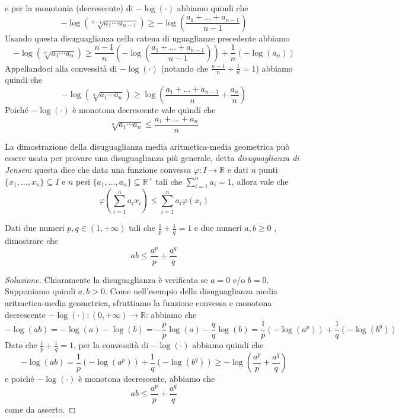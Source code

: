 \begin{example}
\[    \]
    e per la monotonia (decrescente) di $-\log(\cdot)$ abbiamo quindi che
    \[
    -\log(\sqrt[n-1]{a_1 \cdots a_{n-1}}) \ge -\log\left(\frac{a_1 + \dots + a_{n-1}}{n-1}\right)
    \]
    Usando questa disuguaglianza nella catena di uguaglianze precedente abbiamo
    \[
    -\log(\sqrt[n]{a_1 \cdots a_n}) \ge \frac{n-1}{n}\left(-\log\left(\frac{a_1 + \dots + a_{n-1}}{n-1}\right)\right) +\frac{1}{n}(-\log(a_n))
    \]
    Appellandoci alla convessità di $-\log(\cdot)$ (notando che $\frac{n-1}{n}+\frac{1}{n}=1$) abbiamo quindi che
    \[
    -\log(\sqrt[n]{a_1 \cdots a_n}) \ge \log\left(\frac{a_1 + \dots + a_{n-1}}{n}+ \frac{a_n}{n}\right)
    \]
    Poiché $-\log(\cdot)$ è monotona decrescente vale quindi che
    \[
    \sqrt[n]{a_1 \cdots a_n} \le \frac{a_1+\dots + a_n}{n}
    \]
    \end{example}
    \begin{remark}
        La dimostrazione della disuguaglianza media aritmetica-media geometrica può essere usata per provare una disuguaglianza più generale, detta \emph{disuguaglianza di Jensen}: questa dice che data una funzione convessa $\varphi \colon I \to \mathbb{R}$ e dati $n$ punti $\{x_1, \dots, x_n\}\subseteq I$ e $n$ pesi $\{a_1, \dots, a_n\}\subseteq \mathbb{R}^+$ tali che $\sum_{i=1}^n a_i = 1$, allora vale che
        \[
        \varphi\left(\sum_{i=1}^n a_i x_i\right)\le \sum_{i=1}^n a_i \varphi(x_i)
        \]
    \end{remark}
    \begin{exercise}
        \label{ex:9n.2}
        Dati due numeri $p,q\in(1,+\infty)$ tali che $\frac{1}{p}+\frac{1}{q}=1$ e due numeri $a,b\ge 0$ , dimostrare che
        \[
        ab \le \frac{a^p}{p} + \frac{a^q}{q}
        \]
    \end{exercise}
    \begin{proof}[Soluzione]
        Chiaramente la disuguaglianza è verificata se $a=0$ e/o $b=0$. Supponiamo quindi $a,b>0$. Come nell'esempio della disuguaglianza media aritmetica-media geometrica, sfruttiamo la funzione convessa e monotona decrescente $-\log(\cdot)\colon (0,+\infty) \to \mathbb{R}$: abbiamo che
        \[
        -\log(ab) = -\log(a) -\log(b) = -\frac{p}{p}\log(a) - \frac{q}{q}\log(b) = \frac{1}{p}(-\log(a^p)) + \frac{1}{q}(-\log(b^q))
        \]
        Dato che $\frac{1}{p} + \frac{1}{q}=1$, per la convessità di $-\log(\cdot)$ abbiamo quindi che
        \[
        -\log(ab) = \frac{1}{p}(-\log(a^p)) + \frac{1}{q}(-\log(b^q)) \ge -\log\left(\frac{a^p}{p} + \frac{a^q}{q}\right)
        \]
        e poiché $-\log(\cdot)$ è monotona decrescente, abbiamo che 
        \[
        ab \le \frac{a^p}{p} + \frac{a^q}{q}
        \]
        come da asserto.
    \end{proof}
